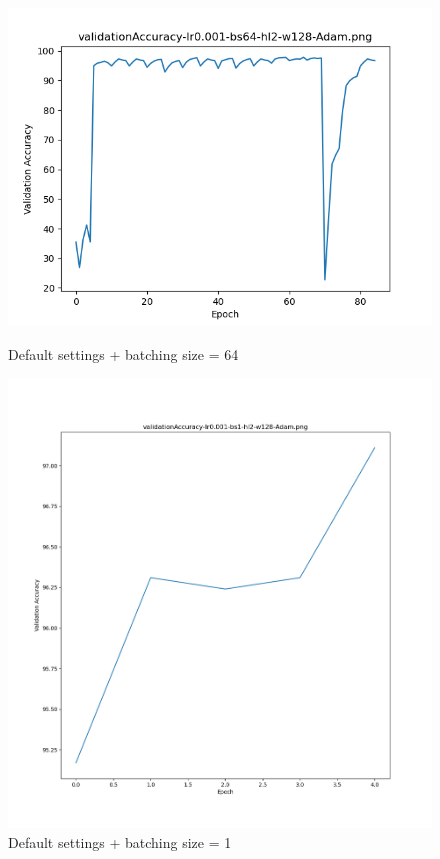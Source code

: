 \documentclass{article}[12pt]
\begin{document}
    \begin{figure}[H]
        \includegraphics[width=\linewidth]{testsResults/validationAccuracy/def.png}
        \caption{Default settings + batching size = 64}
        \endminipage\hfill
        \includegraphics[width=\linewidth]{testsResults/validationAccuracy/validationAccuracy1batch.png}
        \caption{Default settings + batching size = 1}
        \endminipage
    \end{figure}
\end{document}
